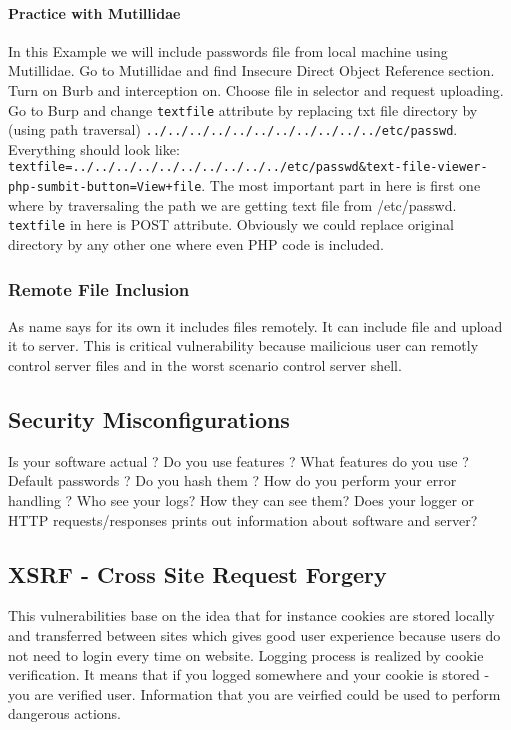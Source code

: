 \documentclass{article}[12pt]
\begin{document}
\paragraph{Practice with Mutillidae}
In this Example we will include passwords file from local machine using Mutillidae.
Go to Mutillidae and find Insecure Direct Object Reference section.
Turn on Burb and interception on.
Choose file in selector and request uploading.
Go to Burp and change \texttt{textfile} attribute by replacing txt file directory by (using path traversal) \texttt{../../../../../../../../../../../etc/passwd}.
Everything should look like: \texttt{textfile=../../../../../../../../../../etc/passwd\&text-file-viewer-php-sumbit-button=View+file}.
The most important part in here is first one where by traversaling the path we are getting text file from /etc/passwd. \texttt{textfile} in here is POST attribute.
Obviously we could replace original directory by any other one where even PHP code is included.

\subsubsection{Remote File Inclusion} As name says for its own it includes files remotely.
It can include file and upload it to server.
This is critical vulnerability because mailicious user can remotly control server files and in the worst scenario control server shell.



\subsection{Security Misconfigurations}
Is your software actual ? \newline
Do you use features ? What features do you use ? \newline
Default passwords ? Do you hash them ? \newline
How do you perform your error handling ? \newline
Who see your logs? How they can see them? \newline
Does your logger or HTTP requests/responses prints out information about software and server?


\subsection{XSRF - Cross Site Request Forgery}
This vulnerabilities base on the idea that for instance cookies are stored locally and transferred between sites which gives good user experience because users do not need to login every time on website.
Logging process is realized by cookie verification.
It means that if you logged somewhere and your cookie is stored - you are verified user.
Information that you are veirfied could be used to perform dangerous actions.
\end{document}
